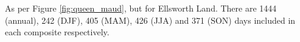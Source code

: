 \label{fig:ellsworth}
As per Figure \ref{fig:queen_maud}, but for Ellsworth Land. There are 1444 (annual), 242 (DJF), 405 (MAM), 426 (JJA) and 371 (SON) days included in each composite respectively.